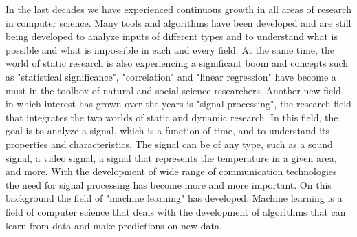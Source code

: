 In the last decades we have experienced continuous growth in all areas of research in computer science. Many tools and algorithms have been developed and are still being developed to analyze inputs of different types and to understand what is possible and what is impossible in each and every field.
At the same time, the world of static research is also experiencing a significant boom and concepts such as "statistical significance", "correlation" and "linear regression" have become a must in the toolbox of natural and social science researchers.
Another new field in which interest has grown over the years is "signal processing", the research field that integrates the two worlds of static and dynamic research. In this field, the goal is to analyze a signal, which is a function of time, and to understand its properties and characteristics. The signal can be of any type, such as a sound signal, a video signal, a signal that represents the temperature in a given area, and more. 
With the development of wide range of communication technologies the need for signal processing has become more and more important.
On this background the field of "machine learning" has developed. 
Machine learning is a field of computer science that deals with the development of algorithms that can learn from data and make predictions on new data.
